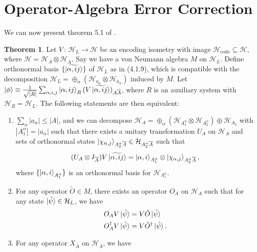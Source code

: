 \documentclass[12pt,a4paper]{report}
\numberwithin{equation}{section}
\newcommand{\Hcode}{\mathcal{H}_{\text{code}}}
\newcommand{\ol}[1]{\overline{#1}}
\theoremstyle{definition}
\theoremstyle{theorem}
\newtheorem{theorem}{Theorem}[section]
\theoremstyle{theorem}
\theoremstyle{example}
\theoremstyle{definition}
\begin{document}
\section{Operator-Algebra Error Correction}
We can now present theorem 5.1 of \cite{Harlow}.
\begin{theorem}
	Let $V\,:\,\mathcal{H}_{L}\to \mathcal{H}$ be an encoding isometry with image $\Hcode\subseteq\mathcal{H}$, where $\mathcal{H}=\mathcal{H}_{A}\otimes\mathcal{H}_{\ol{A}}$. Say we have a von Neumann algebra $M$ on $\mathcal{H}_{L}$. Define orthonormal basis $\{\ket{\widetilde{\alpha,ij}}\}$ of $\mathcal{H}_{L}$ as in (4.1.9), which is compatible with the decomposition $\mathcal{H}_{L}=\oplus_{\alpha}(\mathcal{H}_{a_{\alpha}}\otimes\mathcal{H}_{\ol{a}_{\alpha}})$ induced by $M$. Let $\ket{\phi}\equiv\frac{1}{\sqrt{|R|}}\sum_{\alpha,i,j}\ket{\alpha,ij}_{R}(V\ket{\widetilde{\alpha,ij}})_{A\ol{A}}$, where $R$ is an auxiliary system with $\mathcal{H}_{R}=\mathcal{H}_{L}$. The following statements are then equivalent:
	\begin{enumerate}
		\item $\sum_{\alpha}|a_{\alpha}|\leq|A|$, and we can decompose $\mathcal{H}_{A}=\oplus_{\alpha}(\mathcal{H}_{A_{1}^{\alpha}}\otimes\mathcal{H}_{A_{2}^{\alpha}})\oplus\mathcal{H}_{A_{3}}$ with $|A_{1}^{\alpha}|=|a_{\alpha}|$ such that there exists a unitary transformation $U_{A}$ on $\mathcal{H}_{A}$ and sets of orthonormal states $\ket{\chi_{\alpha,j}}_{A_{2}^{\alpha}\ol{A}}\in\mathcal{H}_{A_{2}^{\alpha}\ol{A}}$ such that
		\begin{equation}
			(U_{A}\otimes I_{\ol{A}})V\ket{\widetilde{\alpha,ij}}=\ket{\alpha,i}_{A_{1}^{\alpha}}\otimes\ket{\chi_{\alpha,j}}_{A_{2}^{\alpha}\ol{A}},
		\end{equation}
		where $\{\ket{\alpha,i}_{A_{1}^{\alpha}}\}$ is an orthonormal basis for $\mathcal{H}_{A_{1}^{\alpha}}$.
		\item For any operator $\tilde{O}\in M$, there exists an operator $O_{A}$ on $\mathcal{H}_{A}$ such that for any state $\ket{\tilde{\psi}}\in\mathcal{H}_{L}$, we have
		\begin{equation}
			\begin{aligned}
				O_{A}V\ket{\tilde{\psi}}&=V\tilde{O}\ket{\tilde{\psi}}\\
				O_{A}^{\dagger}V\ket{\tilde{\psi}}&=V\tilde{O}^{\dagger}\ket{\tilde{\psi}}.
			\end{aligned}
		\end{equation}
		\item For any operator $X_{\ol{A}}$ on $\mathcal{H}_{\ol{A}}$, we have

\end{enumerate}
\end{theorem}
\end{document}
